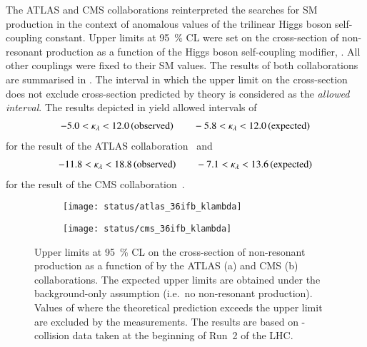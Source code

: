 The ATLAS and CMS collaborations reinterpreted the searches for SM \HH
production in the context of anomalous values of the trilinear Higgs boson
self-coupling constant. Upper limits at \SI{95}{\percent} CL were set on the
cross-section of non-resonant \HH production as a function of the Higgs boson
self-coupling modifier, \klambda. All other couplings were fixed to their SM
values. The results of both collaborations are summarised in
. The \klambda interval in which the upper limit
on the cross-section does not exclude cross-section predicted by theory is
considered as the \emph{allowed \klambda interval}. The results depicted in
 yield allowed \klambda intervals of
\begin{align*}
  -5.0 < \kappa_{\lambda} < 12.0 \,\text{(observed)} \qquad -5.8 < \kappa_{\lambda} < 12.0 \,\text{(expected)}
\end{align*}
for the result of the ATLAS collaboration~\cite{HDBS-2018-58} and
\begin{align*}
  -11.8 < \kappa_{\lambda} < 18.8 \,\text{(observed)} \qquad -7.1 < \kappa_{\lambda} < 13.6 \,\text{(expected)}
\end{align*}
for the result of the CMS collaboration~\cite{CMS-HIG-17-030}.

\begin{figure}[htbp]
  \centering

  \begin{subfigure}[b]{0.48\textwidth}
    \centering

    \texttt{[image: status/atlas\_36ifb\_klambda]}

  \end{subfigure}\hfill%
  \begin{subfigure}[b]{0.48\textwidth}
    \centering

    \texttt{[image: status/cms\_36ifb\_klambda]}

  \end{subfigure}

  \caption{Upper limits at \SI{95}{\percent} CL on the cross-section of
    non-resonant \HH production as a function of \klambda by the ATLAS (a) and
    CMS (b) collaborations. The expected upper limits are obtained under the
    background-only assumption (i.e.\ no non-resonant \HH production). Values of
    \klambda where the theoretical prediction exceeds the upper limit are
    excluded by the measurements. The results are based on \pp-collision data
    taken at the beginning of Run~2 of the LHC.}%
  \label{fig:prior_status_klambda}
\end{figure}


